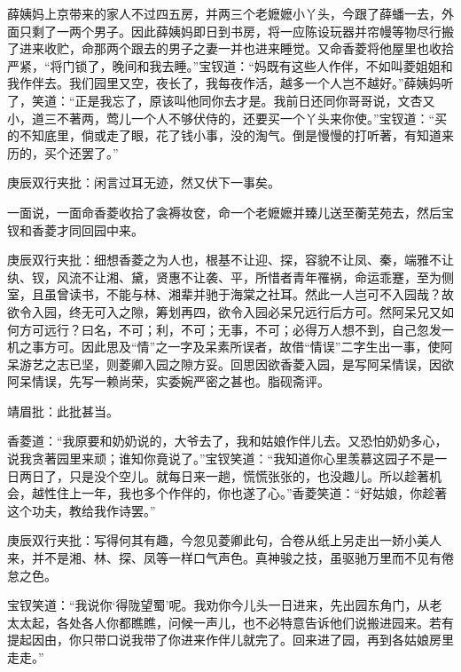 \begin{parag}


    薛姨妈上京带来的家人不过四五房，并两三个老嬷嬷小丫头，今跟了薛蟠一去，外面只剩了一两个男子。因此薛姨妈即日到书房，将一应陈设玩器并帘幔等物尽行搬了进来收贮，命那两个跟去的男子之妻一并也进来睡觉。又命香菱将他屋里也收拾严紧，“将门锁了，晚间和我去睡。”宝钗道：“妈既有这些人作伴，不如叫菱姐姐和我作伴去。我们园里又空，夜长了，我每夜作活，越多一个人岂不越好。”薛姨妈听了，笑道：“正是我忘了，原该叫他同你去才是。我前日还同你哥哥说，文杏又小，道三不著两，莺儿一个人不够伏侍的，还要买一个丫头来你使。”宝钗道：“买的不知底里，倘或走了眼，花了钱小事，没的淘气。倒是慢慢的打听著，有知道来历的，买个还罢了。”\begin{note}庚辰双行夹批：闲言过耳无迹，然又伏下一事矣。\end{note}一面说，一面命香菱收拾了衾褥妆奁，命一个老嬷嬷并臻儿送至蘅芜苑去，然后宝钗和香菱才同回园中来。\begin{note}庚辰双行夹批：细想香菱之为人也，根基不让迎、探，容貌不让凤、秦，端雅不让纨、钗，风流不让湘、黛，贤惠不让袭、平，所惜者青年罹祸，命运乖蹇，至为侧室，且虽曾读书，不能与林、湘辈并驰于海棠之社耳。然此一人岂可不入园哉？故欲令入园，终无可入之隙，筹划再四，欲令入园必呆兄远行后方可。然阿呆兄又如何方可远行？曰名，不可；利，不可；无事，不可；必得万人想不到，自己忽发一机之事方可。因此思及“情”之一字及呆素所误者，故借“情误”二字生出一事，使阿呆游艺之志已坚，则菱卿入园之隙方妥。回思因欲香菱入园，是写阿呆情误，因欲阿呆情误，先写一赖尚荣，实委婉严密之甚也。脂砚斋评。\end{note}\begin{note}靖眉批：此批甚当。\end{note}
\end{parag}


\begin{parag}


    香菱道：“我原要和奶奶说的，大爷去了，我和姑娘作伴儿去。又恐怕奶奶多心，说我贪著园里来顽；谁知你竟说了。”宝钗笑道：“我知道你心里羡慕这园子不是一日两日了，只是没个空儿。就每日来一趟，慌慌张张的，也没趣儿。所以趁著机会，越性住上一年，我也多个作伴的，你也遂了心。”香菱笑道：“好姑娘，你趁著这个功夫，教给我作诗罢。”\begin{note}庚辰双行夹批：写得何其有趣，今忽见菱卿此句，合卷从纸上另走出一娇小美人来，并不是湘、林、探、凤等一样口气声色。真神骏之技，虽驱驰万里而不见有倦怠之色。\end{note}宝钗笑道：“我说你‘得陇望蜀’呢。我劝你今儿头一日进来，先出园东角门，从老太太起，各处各人你都瞧瞧，问候一声儿，也不必特意告诉他们说搬进园来。若有提起因由，你只带口说我带了你进来作伴儿就完了。回来进了园，再到各姑娘房里走走。”
\end{parag}


